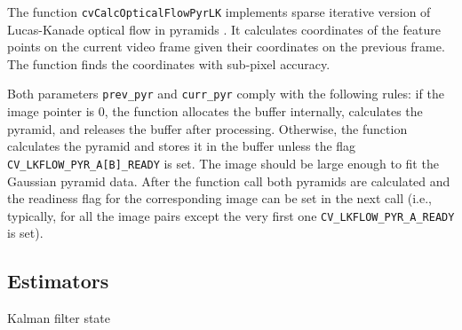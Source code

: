 The function \texttt{cvCalcOpticalFlowPyrLK} implements sparse iterative version of Lucas-Kanade optical flow in pyramids
\cite{Bouguet00}
. It calculates coordinates of the feature points on the current video
frame given their coordinates on the previous frame. The function finds
the coordinates with sub-pixel accuracy.

Both parameters \texttt{prev\_pyr} and \texttt{curr\_pyr} comply with the
following rules: if the image pointer is 0, the function allocates the
buffer internally, calculates the pyramid, and releases the buffer after
processing. Otherwise, the function calculates the pyramid and stores
it in the buffer unless the flag \texttt{CV\_LKFLOW\_PYR\_A[B]\_READY}
is set. The image should be large enough to fit the Gaussian pyramid
data. After the function call both pyramids are calculated and the
readiness flag for the corresponding image can be set in the next call
(i.e., typically, for all the image pairs except the very first one
\texttt{CV\_LKFLOW\_PYR\_A\_READY} is set).

\subsection{Estimators}

\label{CvKalman}

Kalman filter state

